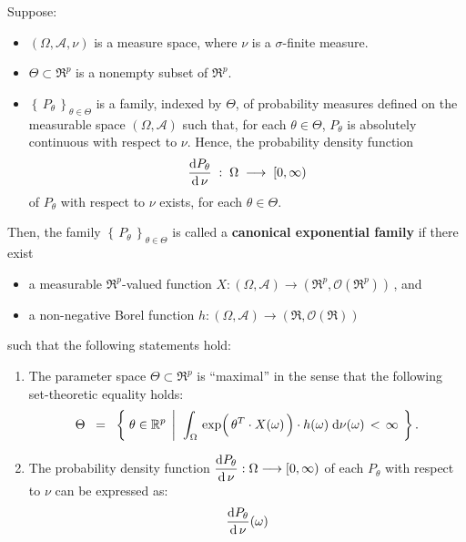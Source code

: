 \begin{definition}
\mbox{}\vskip 0.1cm
\noindent
Suppose:
\begin{itemize}
\item
	$(\Omega,\mathcal{A},\nu)$ is a measure space, where $\nu$ is a $\sigma$-finite measure.
\item
	$\Theta \subset \Re^{p}$ is a nonempty subset of $\Re^{p}$.
\item
	$\left\{\,P_{\theta}\,\right\}_{\theta \in \Theta}$ is a family, indexed by $\Theta$,
	of probability measures defined on the measurable space $(\Omega,\mathcal{A})$ such that,
	for each $\theta \in \Theta$, $P_{\theta}$ is absolutely continuous with respect to $\nu$.
	Hence, the probability density function
	\begin{equation*}
	\dfrac{\textnormal{d} P_{\theta}}{\textnormal{d}\,\nu} \; : \; \Omega \; \longrightarrow \; [0,\infty)
	\end{equation*}
	of $P_{\theta}$ with respect to $\nu$ exists, for each $\theta \in \Theta$.
\end{itemize}
Then, the family $\left\{\,P_{\theta}\,\right\}_{\theta \in \Theta}$ is called a \textbf{canonical exponential family}
if there exist
\begin{itemize}
\item
	a measurable $\Re^{p}$-valued function $X : (\Omega,\mathcal{A}) \longrightarrow (\Re^{p},\mathcal{O}(\Re^{p}))$\,, and
\item
	a non-negative Borel function $h : (\Omega,\mathcal{A}) \longrightarrow (\Re,\mathcal{O}(\Re))$
\end{itemize}
such that the following statements hold:
\begin{enumerate}
\item
	The parameter space $\Theta \subset \Re^{p}$ is ``maximal''
	in the sense that the following set-theoretic equality holds:
	\begin{equation*}
	\Theta
	\;\; = \;\;
		\left\{\;
			\theta \in \Re^{p}
			\;\left\vert\;\;
			\int_{\Omega}\,
				\exp\!\left(\,\theta^{T} \!\overset{{\color{white}-}}{\cdot}\! X(\omega)\,\right) \cdot h(\omega)
			\;\d\nu(\omega)
			\, < \, \infty
			\right.
		\;\right\}.
	\end{equation*}	
\item
	The probability density function
	$\dfrac{\textnormal{d} P_{\theta}}{\textnormal{d}\,\nu} : \Omega \longrightarrow [0,\infty)$
	of each $P_{\theta}$ with respect to $\nu$ can be expressed as:
	\begin{equation*}
	\dfrac{\d P_{\theta}}{\d\,\nu}(\omega)

\end{equation*}
\end{enumerate}
\end{definition}
